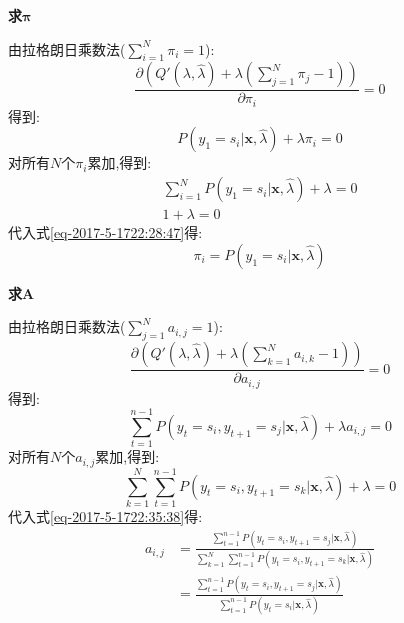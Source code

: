 \documentclass[UTF8,a4paper]{ctexart}%
\begin{document}
            \textbf{求$\bm{\pi}$}

            由拉格朗日乘数法($\sum_{i= 1}^N \pi_i = 1$):
            \begin{equation}
              \frac{\partial\left( Q'(\lambda,\hat{\lambda}) + \lambda\left( \sum_{j = 1}^N \pi_j - 1\right) \right)}{\partial \pi_i} = 0
            \end{equation}
            得到:
            \begin{equation}
              P(y_1 = s_i|\bm{x},\hat{\lambda}) + \lambda \pi_i = 0
              \label{eq-2017-5-1722:28:47}
            \end{equation}
            对所有$N$个$\pi_i$累加,得到:
            \begin{equation}
              \begin{split}
              \sum_{i = 1}^N P(y_1 = s_i|\bm{x},\hat{\lambda}) + \lambda = 0\\
              1 + \lambda = 0
              \end{split}
            \end{equation}
            代入式\eqref{eq-2017-5-1722:28:47}得:
            \begin{equation}
              \pi_i = P(y_1 = s_i|\bm{x},\hat{\lambda})
            \end{equation}

            \textbf{求$\bm{A}$}

            由拉格朗日乘数法($\sum_{j = 1}^N a_{i,j} = 1$):
            \begin{equation}
              \frac{\partial\left( Q'(\lambda,\hat{\lambda}) + \lambda\left( \sum_{k = 1}^N a_{i,k} - 1 \right) \right)}{\partial a_{i,j}} = 0
            \end{equation}
            得到:
            \begin{equation}
              \sum_{t = 1}^{n-1}
                  P(y_t = s_i , y_{t+1} = s_j|\bm{x},\hat{\lambda})  + \lambda a_{i,j} = 0
              \label{eq-2017-5-1722:35:38}
            \end{equation}
            对所有$N$个$a_{i,j}$累加,得到:
            \begin{equation}
              \sum_{k = 1}^N \sum_{t = 1}^{n-1}
                  P(y_t = s_i , y_{t+1} = s_k|\bm{x},\hat{\lambda})  + \lambda = 0
            \end{equation}
            代入式\eqref{eq-2017-5-1722:35:38}得:
            \begin{equation}
              \begin{split}
              a_{i,j} &= \frac{ \sum_{t = 1}^{n-1}
                  P(y_t = s_i , y_{t+1} = s_j|\bm{x},\hat{\lambda}) }{\sum_{k = 1}^N \sum_{t = 1}^{n-1}
                  P(y_t = s_i , y_{t+1} = s_k|\bm{x},\hat{\lambda})}\\
                  &= \frac{ \sum_{t = 1}^{n-1}
                      P(y_t = s_i , y_{t+1} = s_j|\bm{x},\hat{\lambda}) }{ \sum_{t = 1}^{n-1}
                      P(y_t = s_i|\bm{x},\hat{\lambda})}
                \end{split}
            \end{equation}
\end{document}
